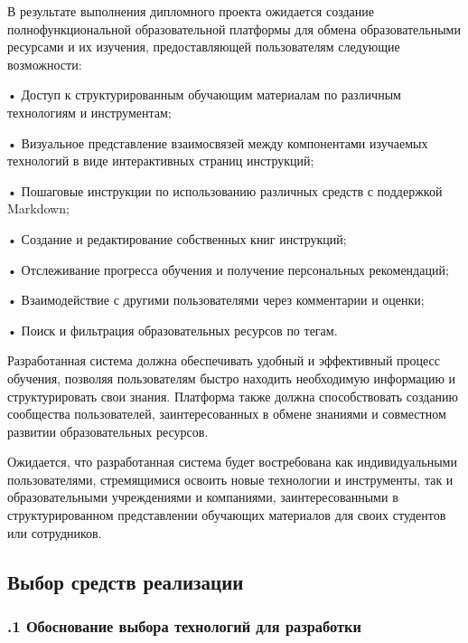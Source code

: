 {\gostFont

  \par \redline В результате выполнения дипломного проекта ожидается создание полнофункциональной образовательной платформы для обмена образовательными ресурсами и их изучения, предоставляющей пользователям следующие возможности:

  \par \redline • Доступ к структурированным обучающим материалам по различным технологиям и инструментам;
  \par \redline • Визуальное представление взаимосвязей между компонентами изучаемых технологий в виде интерактивных страниц инструкций;
  \par \redline • Пошаговые инструкции по использованию различных средств с поддержкой Mark\-down;
  \par \redline • Создание и редактирование собственных книг инструкций;
  \par \redline • Отслеживание прогресса обучения и получение персональных рекомендаций;
  \par \redline • Взаимодействие с другими пользователями через комментарии и оценки;
  \par \redline • Поиск и фильтрация образовательных ресурсов по тегам.

  \par \redline Разработанная система должна обеспечивать удобный и эффективный процесс обучения, позволяя пользователям быстро находить необходимую информацию и структурировать свои знания. Платформа также должна способствовать созданию сообщества пользователей, заинтересованных в обмене знаниями и совместном развитии образовательных ресурсов.

  \par \redline Ожидается, что разработанная система будет востребована как индивидуальными пользователями, стремящимися освоить новые технологии и инструменты, так и образовательными учреждениями и компаниями, заинтересованными в структурированном представлении обучающих материалов для своих студентов или сотрудников.

  \par
}

\subsection*{
  \gostTitleFont
   Выбор средств реализации
}

\titlespace

\subsubsection*{ 
  \gostTitleFont
  .1 Обоснование выбора технологий для разработки
} 

